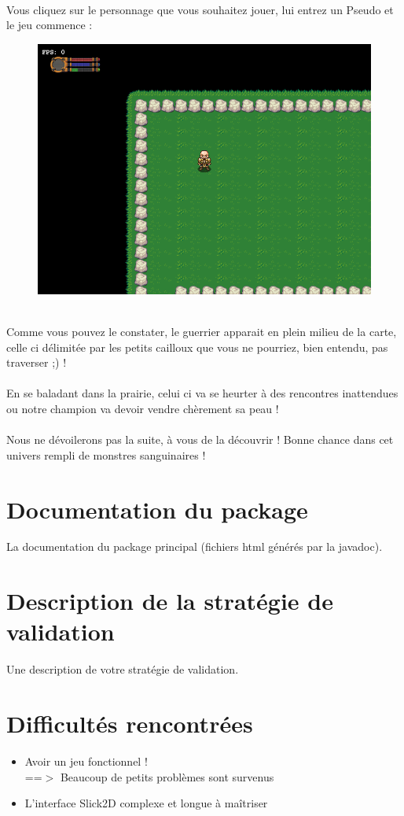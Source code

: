 \documentclass[a4paper,titlepage]{article}
\begin{document}
	\\Vous cliquez sur le personnage que vous souhaitez jouer, lui entrez un Pseudo et le jeu commence :
	\begin{figure}[h!]
		\includegraphics[scale=0.65]{EcranCarte.png}
	\end{figure}
	\\Comme vous pouvez le constater, le guerrier apparait en plein milieu de la carte, celle ci délimitée par les petits cailloux que vous ne pourriez, bien entendu, pas traverser ;) !\\
	\\En se baladant dans la prairie, celui ci va se heurter à des rencontres inattendues ou notre champion va devoir vendre chèrement sa peau !\\
	\\Nous ne dévoilerons pas la suite, à vous de la découvrir ! Bonne chance dans cet univers rempli de monstres sanguinaires !
	\clearpage
	
	\section{Documentation du package}
	La documentation du package principal (fichiers html générés par la javadoc).
	\clearpage
	
	\section{Description de la stratégie de validation}
	Une description de votre stratégie de validation.
	\clearpage
	
	\section{Difficultés rencontrées}
	\begin{itemize}
		\item Avoir un jeu fonctionnel !\\
		==$>$ Beaucoup de petits problèmes sont survenus
		\item L'interface Slick2D complexe et longue à maîtriser
	\end{itemize}
\end{document}
